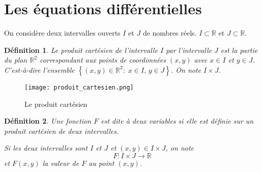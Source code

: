 \documentclass[10pt,a4paper]{article}
\newtheorem{dfn}{Définition}
\begin{document}
\section{Les équations différentielles}


On considère deux intervalles ouverts $I$ et $J$ de nombres réels.
$I\subset \mathbb{R}$ et $J\subset \mathbb{R}$.

\begin{dfn}
Le \textit{produit cartésien} de l'intervalle $I$ par l'intervalle $J$ est la partie du plan
$\mathbb{R}^2$
correspondant aux points de coordonnées $(x,y)$ avec $x\in I$ et $y\in J$.
C'est-à-dire l'ensemble $\left\lbrace (x,y) \in \mathbb{R}^2:\; x\in I,\, y\in J \right\rbrace$.
On note $I\times J$.
\end{dfn}
\begin{figure}[hbtp]
\centering
\texttt{[image: produit\_cartesien.png]}
\caption{Le produit cartésien}
\end{figure}

\begin{dfn}
Une fonction $F$ est dite à deux variables si elle est définie sur un produit cartésien de deux intervalles.

Si les deux intervalles sont $I$ et $J$ et $(x,y)\in I \times J$, on note 
$$F:I\times J \rightarrow \mathbb{R}$$
et $F(x,y)$ la valeur de $F$ au point $(x,y)$.
\end{dfn}
\end{document}
